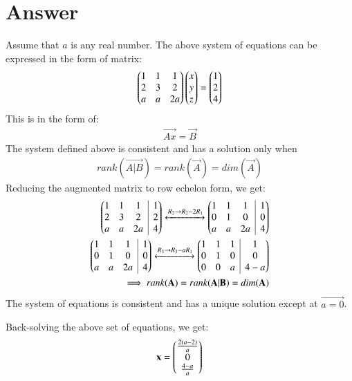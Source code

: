 \documentclass[journal,12pt,twocolumn]{IEEEtran}
\begin{document}
\section{Answer}
Assume that $a$ is any real number. The above system of equations can be expressed in the form of matrix:
\begin{align}
\begin{pmatrix}1 & 1 & 1\\2 & 3 & 2\\a & a & 2a\end{pmatrix} \begin{pmatrix}x\\y\\z\end{pmatrix} = \begin{pmatrix}1\\2\\4\end{pmatrix}
\end{align}
This is in the form of:
\begin{align}
\label{eqn_aug}
\vec{Ax}=\vec{B}
\end{align}
The system defined above is consistent and has a solution only when
\begin{align*}
rank(\vec{A|B}) = rank(\vec{A}) = dim(\vec{A})
\end{align*}
Reducing the augmented matrix to row echelon form, we get:
\begin{align}
\myvec{1 & 1 & 1 & \BAR & 1 \\2 & 3 & 2 & \BAR & 2 \\a & a & 2a & \BAR & 4}
\xleftrightarrow[]{R_2\rightarrow R_2-2R_1}
\myvec{1 & 1 & 1 & \BAR & 1 \\0 & 1 & 0 & \BAR & 0 \\a & a & 2a & \BAR & 4}
\\ \myvec{1 & 1 & 1 & \BAR & 1 \\0 & 1 & 0 & \BAR & 0 \\a & a & 2a & \BAR & 4}\xleftrightarrow[]{R_3\rightarrow R_3-aR_1}
\myvec{1 & 1 & 1 & \BAR & 1 \\0 & 1 & 0 & \BAR & 0 \\0 & 0 & a & \BAR & 4-a}
\\ \implies rank(\vec{A}) = rank(\vec{A|B}) = dim(\vec{A})
\end{align}
The system of equations is consistent and has a unique solution except at $\vec{a = 0}$.

Back-solving the above set of equations, we get:
\begin{align}
\mathbf{x} = \begin{pmatrix}\frac{2(a - 2)}{a} \\ 0 \\ \frac{4-a}{a}\end{pmatrix}
\end{align}
\end{document}
